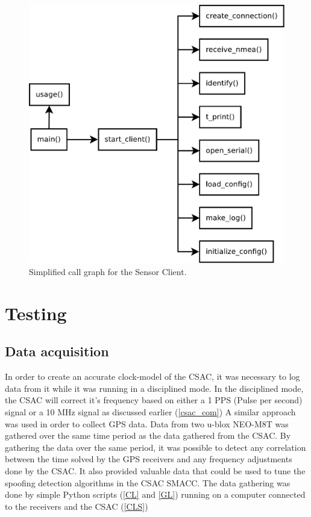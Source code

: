 \documentclass[12pt,english,a4paper]{report}
\begin{document}
\begin{figure}\label{client_call_graph}
\centering
  \includegraphics[scale=0.3]{client_call_graph.pdf}
   \caption[Sensor Client simplified call graph]{Simplified call graph for the Sensor Client.}
\end{figure}

\section{}


\chapter{Testing}
\section{Data acquisition}\label{data_aquisition}
In order to create an accurate clock-model of the CSAC, it was necessary to log data from it while it was running in a disciplined mode. In the disciplined mode, the CSAC will correct it's frequency based on either a 1 PPS (Pulse per second) signal or a 10 MHz signal as discussed earlier (\ref{csac_com}) A similar approach was used in order to collect GPS data. Data from two u-blox NEO-M8T was gathered over the same time period as the data gathered from the CSAC. By gathering the data over the same period, it was possible to detect any correlation between the time solved by the GPS receivers and any frequency adjustments done by the CSAC. It also provided valuable data that could be used to tune the spoofing detection algorithms in the CSAC SMACC. The data gathering was done by simple Python scripts (\ref{CL} and \ref{GL}) running on a computer connected to the receivers and the CSAC (\ref{CLS})
\end{document}
